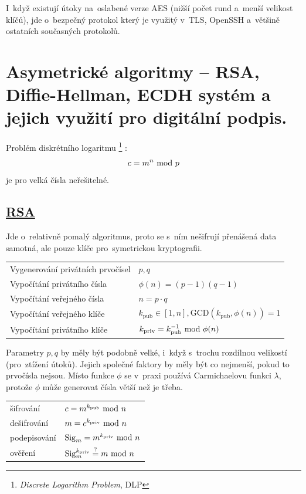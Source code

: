 I~když existují útoky na~oslabené verze AES (nižší počet rund a~menší velikost klíčů), jde o~bezpečný protokol který je využitý v~TLS, OpenSSH a~většině ostatních současných protokolů.

\clearpage
\section{Asymetrické algoritmy -- RSA, Diffie-Hellman, ECDH systém a jejich využití pro digitální podpis.}

Problém diskrétního logaritmu%
\footnote{\emph{Discrete Logarithm Problem}, DLP}%
: $$c = m^n \ \mathrm{mod}\ p$$ je pro velká čísla neřešitelné.

\subsection[RSA]{\href{https://en.wikipedia.org/wiki/RSA_(cryptosystem)}{RSA}}

Jde o~relativně pomalý algoritmus, proto se s~ním nešifrují přenášená data samotná, ale pouze klíče pro~symetrickou kryptografii.

\begin{table}[ht]
\begin{tabular}{ll}
Vygenerování privátních prvočísel & $p, q$ \\
Vypočítání privátního čísla & $\phi(n) = (p-1)(q-1)$ \\
Vypočítání veřejného čísla & $n = p \cdot q$ \\
Vypočítání veřejného klíče & $k_{\mathrm{pub}} \in [1, n], \mathrm{GCD}(k_{\mathrm{pub}}, \phi(n)) = 1$ \\
Vypočítání privátního klíče & $k_{\mathrm{priv}} = k_{\mathrm{pub}}^{-1} \ \mathrm{mod}\ \phi(n)$ \\
\end{tabular}
\end{table}

Parametry $p, q$ by měly být podobně velké, i~když s~trochu rozdílnou velikostí (pro~ztížení útoků). Jejich společné faktory by měly být co nejmenší, pokud to prvočísla nejsou. Místo funkce $\phi$ se v~praxi používá Carmichaelovu funkci $\lambda$, protože $\phi$ může generovat čísla větší než je třeba.

\begin{table}[ht]
\begin{tabular}{ll}
šifrování & $c = m^{k_{\mathrm{pub}}} \ \mathrm{mod}\ n$ \\
dešifrování & $m = c^{k_{\mathrm{priv}}} \ \mathrm{mod}\ n$ \\
podepisování & $\mathrm{Sig}_m = m^{k_{\mathrm{priv}}} \ \mathrm{mod}\ n$ \\
ověření & $\mathrm{Sig}_m^{k_{\mathrm{priv}}} \stackrel{?}{=} m \ \mathrm{mod}\ n$ \\
\end{tabular}
\end{table}


